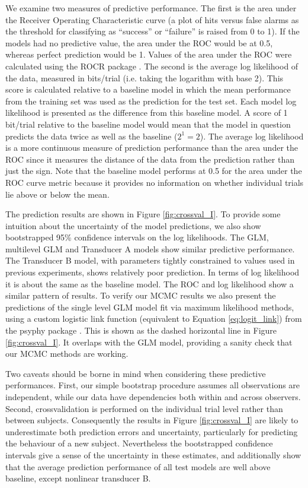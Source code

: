 \documentclass[11pt,a4paper]{article}
\begin{document}
{We examine two measures of predictive performance.
The first is the area under the Receiver Operating Characteristic curve (a plot of hits versus false alarms as the threshold for classifying as ``success'' or ``failure'' is raised from 0 to 1).
If the models had no predictive value, the area under the ROC would be at 0.5, whereas perfect prediction would be 1.
Values of the area under the ROC were calculated using the ROCR package \citep{Sing2005} .
The second is the average log likelihood of the data, measured in bits/trial (i.e. taking the logarithm with base 2).
This score is calculated relative to a baseline model in which the mean performance from the training set was used as the prediction for the test set.
Each model log likelihood is presented as the difference from this baseline model.
A score of 1 bit/trial relative to the baseline model would mean that the model in question predicts the data twice as well as the baseline ($2^1 = 2$). 
The average log likelihood is a more continuous measure of prediction performance than the area under the ROC since it measures the distance of the data from the prediction rather than just the sign.
Note that the baseline model performs at 0.5 for the area under the ROC curve metric because it provides no information on whether individual trials lie above or below the mean.

The prediction results are shown in Figure \ref{fig:crossval_I}.
To provide some intuition about the uncertainty of the model predictions, we also show bootstrapped 95\% confidence intervals on the log likelihoods.
The GLM, multilevel GLM and Transducer A models show similar predictive performance.
The Transducer B model, with parameters tightly constrained to values used in previous experiments, shows relatively poor prediction.
In terms of log likelihood it is about the same as the baseline model.
The ROC and log likelihood show a similar pattern of results.
To verify our MCMC results we also present the predictions of the single level GLM model fit via maximum likelihood methods, using a custom logistic link function (equivalent to Equation \ref{eq:logit_link}) from the psyphy package \citep{knoblauch2014}.
This is shown as the dashed horizontal line in Figure \ref{fig:crossval_I}.
It overlaps with the GLM model, providing a sanity check that our MCMC methods are working.

Two caveats should be borne in mind when considering these predictive performances.
First, our simple bootstrap procedure assumes all observations are independent, while our data have dependencies both within and across observers. 
Second, crossvalidation is performed on the individual trial level rather than between subjects. 
Consequently the results in Figure \ref{fig:crossval_I} are likely to underestimate both prediction errors and uncertainty, particularly for predicting the behaviour of a new subject.
Nevertheless the bootstrapped confidence intervals give a sense of the uncertainty in these estimates, and additionally show that the average prediction performance of all test models are well above baseline, except nonlinear transducer B.

}
\end{document}
